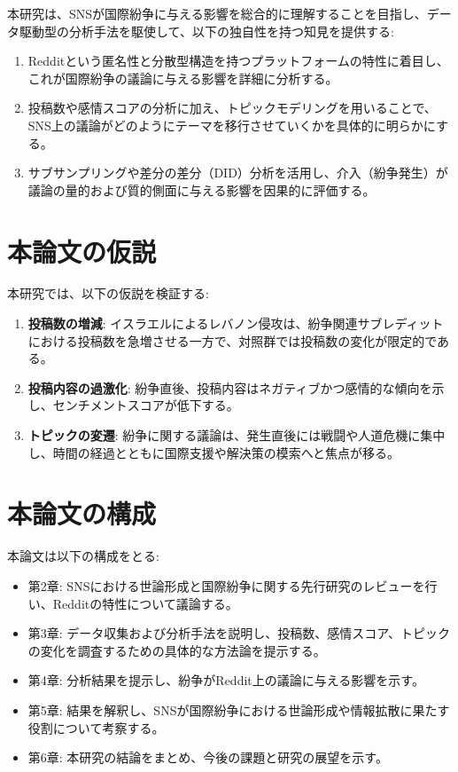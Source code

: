 \documentclass[11pt, a4j]{jreport}
\begin{document}
    本研究は、SNSが国際紛争に与える影響を総合的に理解することを目指し、データ駆動型の分析手法を駆使して、以下の独自性を持つ知見を提供する: 

    \begin{enumerate}
        \item Redditという匿名性と分散型構造を持つプラットフォームの特性に着目し、これが国際紛争の議論に与える影響を詳細に分析する。
        \item 投稿数や感情スコアの分析に加え、トピックモデリングを用いることで、SNS上の議論がどのようにテーマを移行させていくかを具体的に明らかにする。
        \item サブサンプリングや差分の差分（DID）分析を活用し、介入（紛争発生）が議論の量的および質的側面に与える影響を因果的に評価する。
    \end{enumerate}

    \section{本論文の仮説}
    本研究では、以下の仮説を検証する: 
    \begin{enumerate}
        \item \textbf{投稿数の増減}: イスラエルによるレバノン侵攻は、紛争関連サブレディットにおける投稿数を急増させる一方で、対照群では投稿数の変化が限定的である。
        \item \textbf{投稿内容の過激化}: 紛争直後、投稿内容はネガティブかつ感情的な傾向を示し、センチメントスコアが低下する。
        \item \textbf{トピックの変遷}: 紛争に関する議論は、発生直後には戦闘や人道危機に集中し、時間の経過とともに国際支援や解決策の模索へと焦点が移る。
    \end{enumerate}

    \section{本論文の構成}
    本論文は以下の構成をとる: 
    \begin{itemize}
        \item 第2章: SNSにおける世論形成と国際紛争に関する先行研究のレビューを行い、Redditの特性について議論する。
        \item 第3章: データ収集および分析手法を説明し、投稿数、感情スコア、トピックの変化を調査するための具体的な方法論を提示する。
        \item 第4章: 分析結果を提示し、紛争がReddit上の議論に与える影響を示す。
        \item 第5章: 結果を解釈し、SNSが国際紛争における世論形成や情報拡散に果たす役割について考察する。
        \item 第6章: 本研究の結論をまとめ、今後の課題と研究の展望を示す。
    \end{itemize}
\end{document}

